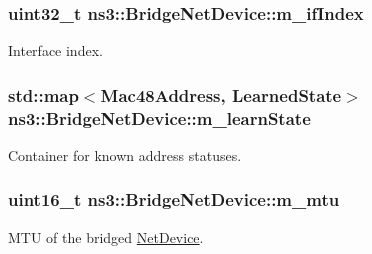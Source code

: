 \subsubsection[{\texorpdfstring{m\+\_\+if\+Index}{m_ifIndex}}]{\setlength{\rightskip}{0pt plus 5cm}uint32\+\_\+t ns3\+::\+Bridge\+Net\+Device\+::m\+\_\+if\+Index\hspace{0.3cm}{\ttfamily [private]}}\hypertarget{classns3_1_1BridgeNetDevice_a224b5e6b5a12b9c1dbafec290165eac5}{}\label{classns3_1_1BridgeNetDevice_a224b5e6b5a12b9c1dbafec290165eac5}


Interface index. 

\subsubsection[{\texorpdfstring{m\+\_\+learn\+State}{m_learnState}}]{\setlength{\rightskip}{0pt plus 5cm}std\+::map$<${\bf Mac48\+Address}, {\bf Learned\+State}$>$ ns3\+::\+Bridge\+Net\+Device\+::m\+\_\+learn\+State\hspace{0.3cm}{\ttfamily [private]}}\hypertarget{classns3_1_1BridgeNetDevice_a201ac30909835a3efd1b34470e8fb5ec}{}\label{classns3_1_1BridgeNetDevice_a201ac30909835a3efd1b34470e8fb5ec}


Container for known address statuses. 

\subsubsection[{\texorpdfstring{m\+\_\+mtu}{m_mtu}}]{\setlength{\rightskip}{0pt plus 5cm}uint16\+\_\+t ns3\+::\+Bridge\+Net\+Device\+::m\+\_\+mtu\hspace{0.3cm}{\ttfamily [private]}}\hypertarget{classns3_1_1BridgeNetDevice_ab0ab0e7f99c14058e65f12bfea364641}{}\label{classns3_1_1BridgeNetDevice_ab0ab0e7f99c14058e65f12bfea364641}


M\+TU of the bridged \hyperlink{classns3_1_1NetDevice}{Net\+Device}. 

